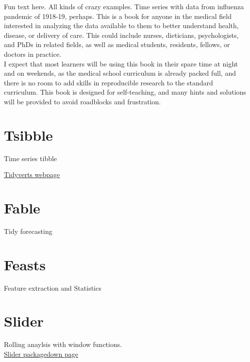 \documentclass[]{book}
\begin{document}
Fun text here.
All kinds of crazy examples.
Time series with data from influenza pandemic of 1918-19, perhaps.
This is a book for anyone in the medical field interested in analyzing the data available to them to better understand health, disease, or delivery of care. This could include nurses, dieticians, psychologists, and PhDs in related fields, as well as medical students, residents, fellows, or doctors in practice.\\
I expect that most learners will be using this book in their spare time at night and on weekends, as the medical school curriculum is already packed full, and there is no room to add skills in reproducible research to the standard curriculum. This book is designed for self-teaching, and many hints and solutions will be provided to avoid roadblocks and frustration.

\hypertarget{tsibble}{%
\section{Tsibble}\label{tsibble}}

Time series tibble

\href{https://tidyverts.org}{Tidyverts webpage}

\hypertarget{fable}{%
\section{Fable}\label{fable}}

Tidy forecasting

\hypertarget{feasts}{%
\section{Feasts}\label{feasts}}

Feature extraction and Statistics

\hypertarget{slider}{%
\section{Slider}\label{slider}}

Rolling anaylsis with window functions.\\
\href{https://davisvaughan.github.io/slider/}{Slider packagedown page}


\end{document}
